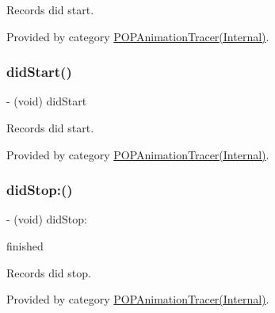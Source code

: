 Records did start. 

Provided by category \mbox{\hyperlink{category_p_o_p_animation_tracer_07_internal_08_a91b472c0e05c912fe9d05e2e9de17f9f}{P\+O\+P\+Animation\+Tracer(\+Internal)}}.

\mbox{\label{interface_p_o_p_animation_tracer_a91b472c0e05c912fe9d05e2e9de17f9f}} 
\subsubsection{\texorpdfstring{did\+Start()}{didStart()}\hspace{0.1cm}{\footnotesize\ttfamily [2/2]}}
{\footnotesize\ttfamily -\/ (void) did\+Start \begin{DoxyParamCaption}{ }\end{DoxyParamCaption}}

Records did start. 

Provided by category \mbox{\hyperlink{category_p_o_p_animation_tracer_07_internal_08_a91b472c0e05c912fe9d05e2e9de17f9f}{P\+O\+P\+Animation\+Tracer(\+Internal)}}.

\mbox{\label{interface_p_o_p_animation_tracer_aa97d51350238303c671157f782583a9b}} 
\subsubsection{\texorpdfstring{did\+Stop\+:()}{didStop:()}\hspace{0.1cm}{\footnotesize\ttfamily [1/2]}}
{\footnotesize\ttfamily -\/ (void) did\+Stop\+: \begin{DoxyParamCaption}\item[{(B\+O\+OL)}]{finished }\end{DoxyParamCaption}}

Records did stop. 

Provided by category \mbox{\hyperlink{category_p_o_p_animation_tracer_07_internal_08_aa97d51350238303c671157f782583a9b}{P\+O\+P\+Animation\+Tracer(\+Internal)}}.

\mbox{\label{interface_p_o_p_animation_tracer_aa97d51350238303c671157f782583a9b}} 
